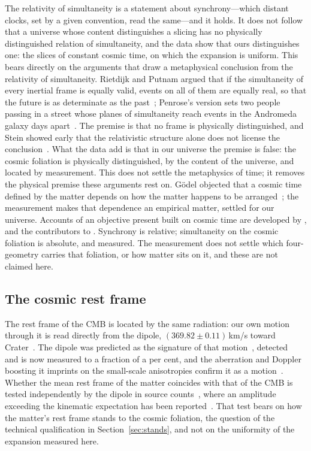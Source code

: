 \documentclass[twocolumn]{aastex701}
\begin{document}
The relativity of simultaneity is a statement about synchrony---which distant clocks, set by a given convention, read the same---and it holds. It does not follow that a universe whose content distinguishes a slicing has no physically distinguished relation of simultaneity, and the data show that ours distinguishes one: the slices of constant cosmic time, on which the expansion is uniform. This bears directly on the arguments that draw a metaphysical conclusion from the relativity of simultaneity. Rietdijk and Putnam argued that if the simultaneity of every inertial frame is equally valid, events on all of them are equally real, so that the future is as determinate as the past~\citep{Rietdijk1966, Putnam1967}; Penrose's version sets two people passing in a street whose planes of simultaneity reach events in the Andromeda galaxy days apart~\citep{Penrose1989}. The premise is that no frame is physically distinguished, and Stein showed early that the relativistic structure alone does not license the conclusion~\citep{Stein1968}. What the data add is that in our universe the premise is false: the cosmic foliation is physically distinguished, by the content of the universe, and located by measurement. This does not settle the metaphysics of time; it removes the physical premise these arguments rest on. G\"odel objected that a cosmic time defined by the matter depends on how the matter happens to be arranged~\citep{Godel1949}; the measurement makes that dependence an empirical matter, settled for our universe. Accounts of an objective present built on cosmic time are developed by \citet{Ellis2006}, \citet{EllisRothman2010} and the contributors to \citet{CraigSmith2007}. Synchrony is relative; simultaneity on the cosmic foliation is absolute, and measured. The measurement does not settle which four-geometry carries that foliation, or how matter sits on it, and these are not claimed here.

\subsection{The cosmic rest frame}

The rest frame of the CMB is located by the same radiation: our own motion through it is read directly from the dipole, $(369.82\pm0.11)$\,km/s toward Crater~\citep{Planck2018I}. The dipole was predicted as the signature of that motion~\citep{PeeblesWilkinson1968}, detected~\citep{Smoot1977} and is now measured to a fraction of a per cent, and the aberration and Doppler boosting it imprints on the small-scale anisotropies confirm it as a motion~\citep{Planck2013XXVII}. Whether the mean rest frame of the matter coincides with that of the CMB is tested independently by the dipole in source counts~\citep{EllisBaldwin1984}, where an amplitude exceeding the kinematic expectation has been reported~\citep{Secrest2021, Secrest2025}. That test bears on how the matter's rest frame stands to the cosmic foliation, the question of the technical qualification in Section~\ref{sec:stands}, and not on the uniformity of the expansion measured here.
\end{document}
